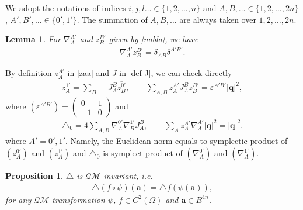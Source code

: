 \documentclass[a4paper,11pt]{amsart}
\numberwithin{equation}{section}
\newtheorem{lem}{Lemma}[section]
\newtheorem{prop}{Proposition}[section]
\begin{document}
We adopt the notations of indices $i,j,l\dots\in\{1,2,\dots,n\}$ and $A,B,\dots\in\{1,2,\dots,2n\}$, $A',B',\dots\in \{0',1'\}$. The summation of $A,B,\dots$ are always taken over $1,2,\dots,2n$.
\begin{lem}\label{lem nabla}\cite[Lemma 3.1]{wang3}
For $\nabla_A^{A'}$ and $z_{B}^{B'}$ given by \eqref{nabla}, we have
\begin{equation}\begin{aligned}\label{delta}
\nabla_{A}^{A'}z_{B}^{B'}=\delta_{AB}\delta^{A'B'}.
\end{aligned}\end{equation}

\end{lem}
By definition $z_A^{A'}$ in \eqref{zaa} and $J$ in \eqref{def J}, we can check directly
\begin{equation}\begin{aligned}\label{z jab}
z_A^{1'}=\sum_B-J_A^B\overline{z_B^{0'}},\qquad\sum_{A,B}z_A^{A'}J_A^Bz_B^{B'}=\varepsilon^{A'B'}|\mathbf{q}|^2,
\end{aligned}\end{equation}
where $\left(\varepsilon^{A'B'}\right)=\left(\begin{matrix}0&1\\-1&0\end{matrix}\right)$ and
\begin{equation}\begin{aligned}\label{z jab2}
\triangle_0=4\sum_{A,B}\nabla_A^{0'}\nabla_{B}^{1'}J_A^B,\qquad  \sum_{A}z_A^{A'}\nabla_A^{A'}|\mathbf{q}|^2=|\mathbf{q}|^2.
\end{aligned}\end{equation}
where $A'=0',1'$. Namely, the Euclidean norm equals to symplectic product of $\left(z_{A}^{0'}\right)$ and $\left(z_{A}^{1'}\right)$ and $\triangle_0$ is symplect product of $\left(\nabla_{A}^{0'}\right)$ and $\left(\nabla_{A}^{1'}\right)$.

\begin{prop}\label{m invariant}
$\triangle$ is $\mathcal{QM}$-invariant, i.e.
\begin{equation*}\begin{aligned}
\triangle(f\circ\psi)(\mathbf{a})=\triangle f(\psi(\mathbf{a})),
\end{aligned}\end{equation*}
for any $\mathcal{QM}$-transformation $\psi$, $f\in C^2(\Omega)$ and $\mathbf{a}\in B^{4n}$.
\end{prop}
\end{document}
